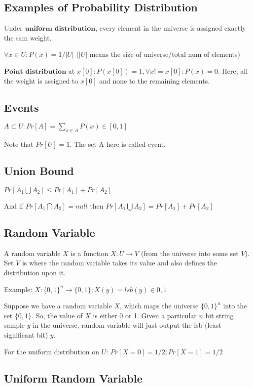 \documentclass[a4paper, 12pt]{article}
\begin{document}
\subsection{Examples of Probability Distribution}

Under $\textbf{uniform distribution}$, every element in the universe is assigned exactly the sam weight.

$\forall x \in U: P(x) = 1/|U|$ ($|U|$ means the size of universe/total num of elements)

$\textbf{Point distribution}$ at $x[0]: P(x[0]) = 1, \forall x!=x[0]: P(x) = 0$. Here, all the weight is assigned to $x[0]$ and none to the remaining elements.

\subsection{Events}

$A \subset U: Pr[A] = \underset{x \in A} \sum P(x) \in [0, 1] $

Note that $Pr[U]=1$. The set A here is called event.

\subsection{Union Bound}

$Pr[A_1 \bigcup A_2] \leq Pr[A_1] + Pr[A_2]$

And if $Pr[A_1 \bigcap A_2] = null$ then $Pr[A_1 \bigcup A_2] = Pr[A_1] + Pr[A_2]$

\subsection{Random Variable}

A random variable $X$ is a function $X:U \rightarrow V$ (from the universe into some set $V$). Set $V$ is where the random variable takes its value and also defines the distribution upon it.

Example: $X: \{0, 1\}^n \rightarrow \{0,1\}; X(y) = lsb(y) \in {0, 1}$

Suppose we have a random variable $X$, which maps the universe $\{0, 1\}^n$ into the set $\{0, 1\}$. So, the value of $X$ is either 0 or 1. Given a particular $n$ bit string sample $y$ in the universe, random variable will just output the lsb (least significant bit) $y$.

For the uniform distribution on $U$: $Pr[X=0] = 1/2 ; Pr[X=1] = 1/2$

\subsection{Uniform Random Variable}
\end{document}
